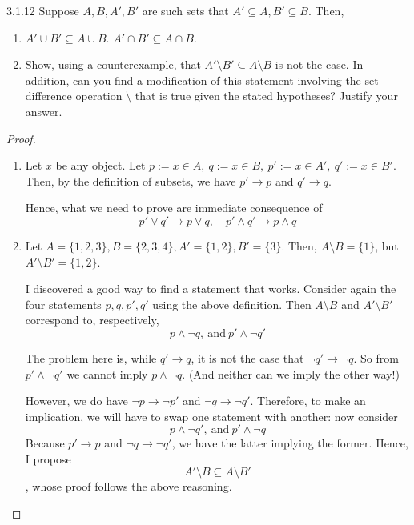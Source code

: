 \begin{exercise}{3.1.12}
	Suppose $A,B,A',B'$ are such sets that $A' \subseteq A, B' \subseteq B$. Then,
	\begin{enumerate}
		\item $A' \cup B' \subseteq A \cup B$. $A' \cap B' \subseteq A \cap B$.
		\item Show, using a counterexample, that $A' \setminus B' \subseteq A \setminus B$ is not the case. In addition, can you find a modification of this statement involving the set difference operation $\setminus$ that is true given the stated hypotheses? Justify your answer.
	\end{enumerate}
\end{exercise}
\begin{proof}\leavevmode
	\begin{enumerate}
		\item Let $x$ be any object. Let $p := x \in A,\ q := x \in B,\ p' := x \in A',\ q' := x \in B'$. Then, by the definition of subsets, we have $p' \to p$ and $q' \to q$.
		
		Hence, what we need to prove are immediate consequence of
		\[
		p' \vee q' \to p \vee q, \quad p' \wedge q' \to p \wedge q
		\]
		
		\item Let $A = \{1,2,3\}, B = \{2,3,4\}, A' = \{1,2\}, B' = \{3\}$. Then, $A \setminus B = \{1\}$, but $A' \setminus B' = \{1,2\}$.
		
		I discovered a good way to find a statement that works. Consider again the four statements $p,q,p',q'$ using the above definition. Then $A \setminus B$ and $A' \setminus B'$ correspond to, respectively,
		\[
		p \wedge \neg q,\ \text{and}\ p' \wedge \neg q'
		\]
		
		The problem here is, while $q' \to q$, it is not the case that $\neg q' \to \neg q$. So from $p' \wedge \neg q'$ we cannot imply $p \wedge \neg q$. (And neither can we imply the other way!)
		
		However, we do have $\neg p \to \neg p'$ and $\neg q \to \neg q'$. Therefore, to make an implication, we will have to swap one statement with another: now consider
		\[
		p \wedge \neg q',\ \text{and}\ p' \wedge \neg q
		\]
		Because $p' \to p$ and $\neg q \to \neg q'$, we have the latter implying the former. Hence, I propose
		\[
		A' \setminus B \subseteq A \setminus B'
		\]
		, whose proof follows the above reasoning.
	\end{enumerate}
\end{proof}

